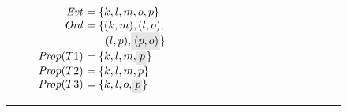 \begin{figure}
  \begin{subfigure}{.5\textwidth}
\begin{center}
\end{center}
    \caption{}
    \label{fig:armvpop:flpop:9}
  \end{subfigure}%
  \begin{subfigure}{.5\textwidth}
\begin{center}
\parbox{63mm}{$\begin{array}{@{}r@{~}l@{}}
  \Evt      &= \{k, l, m, o, p\} \\
  \Ord      &= \{ (k, m), (l, o), \\
            & ~~\quad (l, p), \graybox{(p, o)} \} \\
  \Prop(T1) &= \{k, l, m, \graybox{p}\} \\
  \Prop(T2) &= \{k, l, m, p\} \\
  \Prop(T3) &= \{k, l, o, \graybox{p}\} \\
\end{array}$}
\end{center}
    \caption{}
    \label{fig:armvpop:flpop:10}
  \end{subfigure}
  \hrule


\end{figure}

